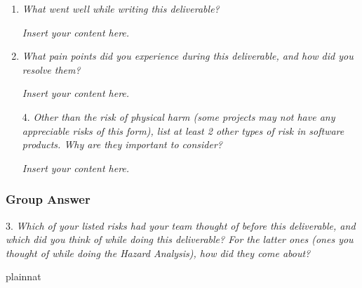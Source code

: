 \documentclass{article}
\newcommand{\lips}{\textit{Insert your content here.}}
\begin{document}
\begin{enumerate}
  \item \textit{What went well while writing this deliverable?}
  
  \lips

  \item \textit{What pain points did you experience during this deliverable, and how did you resolve them?}
  
  \lips
  
  \item[4.] \textit{Other than the risk of physical harm (some projects may not have any appreciable risks of this form),
  list at least 2 other types of risk in software products. Why are they important to consider?}

  \lips

\end{enumerate}

\subsubsection*{Group Answer}

3. \textit{Which of your listed risks had your team thought of before this deliverable, and which did you think of while doing this deliverable? For the latter ones (ones you thought of while doing the Hazard Analysis), how did they come about?}

 {plainnat}

\end{document}
